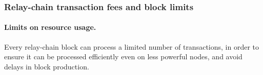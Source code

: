 \subsubsection{Relay-chain transaction fees and block limits}

\paragraph{Limits on resource usage.} Every relay-chain block can process a limited number of transactions, in order to ensure it can be processed efficiently even on less powerful nodes, 
and avoid delays in block production. 






